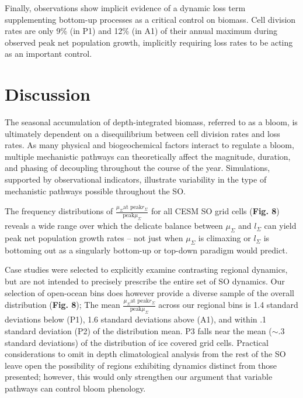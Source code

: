 Finally, observations show implicit evidence of a dynamic loss term supplementing bottom-up processes as a critical control on biomass. Cell division rates are only 9\% (in P1) and 12\% (in A1) of their annual maximum during observed peak net population growth, implicitly requiring loss rates to be acting as an important control. 


\section{Discussion}

The seasonal accumulation of depth-integrated biomass, referred to as a bloom, is ultimately dependent on a disequilibrium between cell division rates and loss rates. As many physical and biogeochemical factors interact to regulate a bloom, multiple mechanistic pathways can theoretically affect the magnitude, duration, and phasing of decoupling throughout the course of the year. Simulations, supported by observational indicators, illustrate variability in the type of mechanistic pathways possible throughout the SO.   

The frequency distributions of $\frac{\mu_\Sigma \textrm{at peak} r_\Sigma}{\textrm{peak} \mu_\Sigma}$ for all CESM SO grid cells (\textbf{Fig. 8}) reveals a wide range over which the delicate balance between $\mu_\Sigma$ and $l_\Sigma$ can yield peak net population growth rates – not just when $\mu_\Sigma$ is climaxing or $l_\Sigma$ is bottoming out as a singularly bottom-up or top-down paradigm would predict. 

Case studies were selected to explicitly examine contrasting regional dynamics, but are not intended to precisely prescribe the entire set of SO dynamics. Our selection of open-ocean bins does however provide a diverse sample of the overall distribution (\textbf{Fig. 8}); The mean $\frac{\mu_\Sigma \textrm{at peak} r_\Sigma}{\textrm{peak} \mu_\Sigma}$ across our regional bins is 1.4 standard deviations below (P1), 1.6 standard deviations above (A1), and within .1 standard deviation (P2) of the distribution mean. P3 falls near the mean ($\sim .3$ standard deviations) of the distribution of ice covered grid cells. Practical considerations to omit in depth climatological analysis from the rest of the SO leave open the possibility of regions exhibiting dynamics distinct from those presented; however, this would only strengthen our argument that variable pathways can control bloom phenology. 

